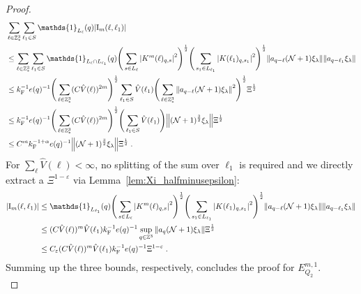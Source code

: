 \documentclass[12pt,a4paper]{article}
\numberwithin{equation}{section}
\newcommand{\1}{\mathbb{I}}
\newcommand{\F}{\mathrm{F}}
\newcommand{\I}{\mathrm{I}}
\newcommand{\Z}{\mathbb{Z}}
\newcommand{\NN}{\mathcal{N}}
\newcommand{\half}{\frac{1}{2}}
\theoremstyle{plain}
\theoremstyle{definition}
\theoremstyle{remark}
\theoremstyle{plain}
\theoremstyle{definition}
\theoremstyle{remark}
\begin{document}
\begin{proof}
\begin{align}
	&\sum_{\ell \in \Z^3_*} \sum_{\ell_1 \in S} \mathds{1}_{L_\ell}(q) |\I_m(\ell, \ell_1)| \nonumber\\
	&\leq \sum_{\ell \in \Z^3_*} \sum_{\ell_1 \in S} \mathds{1}_{L_\ell \cap L_{\ell_1}}(q) \Bigg(\sum\limits_{s \in L_{\ell}} \abs{K^m(\ell)_{q,s}}^2\Bigg)^\half
		\Bigg(\sum\limits_{s_1 \in L_{\ell_1}} \abs{K(\ell_1)_{q,s_1}}^2\Bigg)^\half
		\norm{ a_{q-\ell} (\NN+1) \xi_\lambda}
		\norm{ a_{q-\ell_1} \xi_\lambda }\nonumber\\
	&\leq k_{\F}^{-1} e(q)^{-1}
		\Bigg( \sum_{\ell \in \Z^3_*} (C \hat{V}(\ell))^{2m} \Bigg)^{\half}
		\sum_{\ell_1 \in S} \hat{V}(\ell_1)
		\Bigg( \sum_{\ell \in \Z^3_*} \norm{ a_{q-\ell} (\NN+1) \xi_\lambda}^2 \Bigg)^{\half}
		\Xi^{\half} \nonumber\\
	&\leq k_{\F}^{-1} e(q)^{-1}
		\Bigg( \sum_{\ell \in \Z^3_*} (C \hat{V}(\ell))^{2m} \Bigg)^{\half}
		\Bigg( \sum_{\ell_1 \in S} \hat{V}(\ell_1) \Bigg) \norm{(\NN+1)^{\frac 32} \xi_\lambda} \Xi^{\half} \nonumber\\
	&\leq C^m k_{\F}^{-1 + \alpha} e(q)^{-1}
		\norm{(\NN+1)^{\frac 32} \xi_\lambda} \Xi^{\half} \;. \label{eq:estEQ2113_Coulomb_2}
\end{align}
For $ \sum_\ell \hat{V}(\ell) < \infty $, no splitting of the sum over $ \ell_1 $ is required and we directly extract a $ \Xi^{1-\varepsilon} $ via Lemma~\ref{lem:Xi_halfminusepsilon}:
\begin{align}
	|\I_m(\ell, \ell_1)|
	&\leq \mathds{1}_{L_{\ell_1}}(q) \Bigg(\sum_{s \in L_{\ell}} \abs{K^m(\ell)_{q,s}}^2\Bigg)^\half
		\Bigg(\sum_{s_1 \in L_{\ell_1}} \abs{K(\ell_1)_{q,s_1}}^2\Bigg)^\half
		\norm{ a_{q-\ell} (\NN+1) \xi_\lambda}
		\norm{ a_{q-\ell_1} \xi_\lambda }\nonumber\\
	&\leq (C \hat{V}(\ell))^m \hat{V}(\ell_1) k_{\F}^{-1} e(q)^{-1}
		\sup_{q \in \Z^3} \norm{ a_q (\NN+1) \xi_\lambda }\Xi^{\half} \nonumber\\
	&\leq C_\varepsilon (C \hat{V}(\ell))^m
		\hat{V}(\ell_1)
		k_{\F}^{-1} e(q)^{-1} \Xi^{1-\varepsilon} \;. \label{eq:estEQ2113}
\end{align}
Summing up the three bounds, respectively, concludes the proof for $ E^{m,1}_{Q_2} $.\\


\end{proof}
\end{document}
